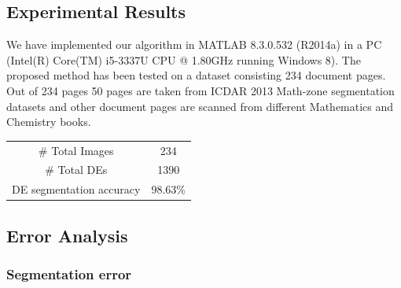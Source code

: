 \documentclass[oneside,a4paper,12pt]{book}
\begin{document}
\subsection{Experimental Results}

We have implemented our algorithm in MATLAB 8.3.0.532
(R2014a) in a PC (Intel(R) Core(TM) i5-3337U CPU @ 1.80GHz
running Windows 8). The proposed method has been tested on
a dataset consisting 234 document pages. Out of 234 pages 50
pages are taken from ICDAR 2013 Math-zone segmentation
datasets and other document pages are scanned from different Mathematics and
Chemistry books. 

%                   
%

\begin{table}[h]
\centering
\begin{tabular}{|c|c|}
\cline{1-2} 
{\color[HTML]{000000} \# Total Images}                     & 234   \\ 	\cline{1-2}
{\color[HTML]{000000} \# Total DEs}                        & 1390    \\ \cline{1-2}
{\color[HTML]{000000} DE segmentation accuracy}            & 98.63\% \\ \cline{1-2}
\end{tabular}
\label{table:result}
\end{table}

\subsection{Error Analysis}

\subsubsection{Segmentation error}
 
\end{document}

